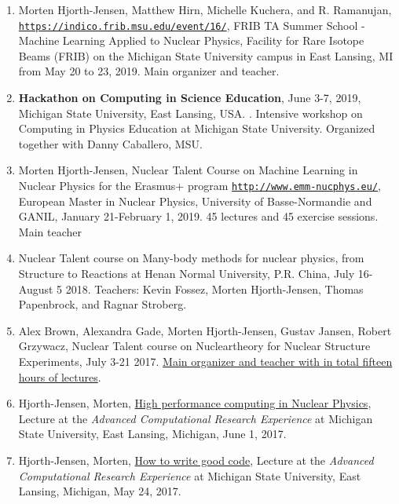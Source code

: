 \documentclass[%
oneside,                 %
final,                   %
10pt]{article}
\begin{document}
\begin{enumerate}
\item Morten Hjorth-Jensen, Matthew Hirn, Michelle Kuchera, and R. Ramanujan, \href{{https://indico.frib.msu.edu/event/16/}}{\nolinkurl{https://indico.frib.msu.edu/event/16/}}, FRIB TA Summer School - Machine Learning Applied to Nuclear Physics, Facility for Rare Isotope Beams (FRIB) on the Michigan State University campus in East Lansing, MI from May 20 to 23, 2019. Main organizer and teacher.

\item \textbf{Hackathon on Computing in Science Education}, June 3-7, 2019, Michigan State University, East Lansing, USA. . Intensive workshop on Computing in Physics Education at Michigan State University. Organized together with Danny Caballero, MSU.

\item Morten Hjorth-Jensen, Nuclear Talent Course on Machine Learning in Nuclear Physics for the Erasmus+ program \href{{http://www.emm-nucphys.eu/}}{\nolinkurl{http://www.emm-nucphys.eu/}}, European Master in Nuclear Physics, University of Basse-Normandie and GANIL, January 21-February 1, 2019. 45 lectures and 45 exercise sessions. Main teacher

\item Nuclear Talent course on Many-body methods for nuclear physics, from Structure to Reactions at Henan Normal University, P.R. China, July 16-August 5 2018. Teachers: Kevin Fossez, Morten Hjorth-Jensen, Thomas Papenbrock, and Ragnar Stroberg. 

\item Alex Brown, Alexandra Gade, Morten Hjorth-Jensen, Gustav Jansen, Robert Grzywacz, Nuclear Talent course on Nucleartheory for Nuclear Structure Experiments, July 3-21 2017. \href{{https://github.com/NuclearTalent/NuclearStructure}}{Main organizer and teacher with in total fifteen hours of lectures}. 

\item Hjorth-Jensen, Morten, \href{{https://icer-acres.msu.edu/summer-2017/schedule/}}{High performance computing in Nuclear Physics}, Lecture at the \emph{Advanced Computational Research Experience} at Michigan State University, East Lansing, Michigan, June 1, 2017.

\item Hjorth-Jensen, Morten, \href{{https://icer-acres.msu.edu/summer-2017/schedule/}}{How to write good code}, Lecture at the \emph{Advanced Computational Research Experience} at Michigan State University, East Lansing, Michigan, May 24, 2017.


\end{enumerate}
\end{document}
